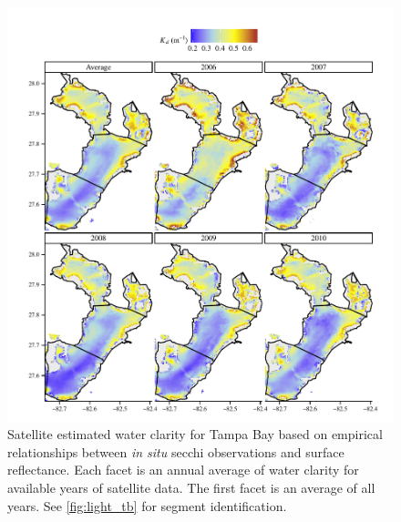 \documentclass[letterpaper,12pt,oneside]{article}\usepackage[]{graphicx}\usepackage[]{color}
\begin{document}
\begin{figure}
\centering
\includegraphics[width = \textwidth]{figs/kd_tb.pdf}
\caption{Satellite estimated water clarity for Tampa Bay based on empirical relationships between \textit{in situ} secchi observations and surface reflectance.  Each facet is an annual average of water clarity for available years of satellite data. The first facet is an average of all years.  See \cref{fig:light_tb} for segment identification.}
\label{fig:kd_tb}
\end{figure}

\end{document}
